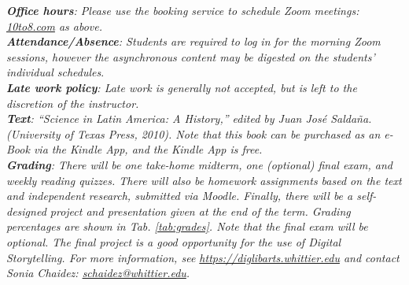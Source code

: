 \documentclass[10pt]{article}
\begin{document}
\textit{\textbf{Office hours}: Please use the booking service to schedule Zoom meetings: \url{10to8.com} as above.} \\
\textit{\textbf{Attendance/Absence}: Students are required to log in for the morning Zoom sessions, however the asynchronous content may be digested on the students' individual schedules}.\\ 
\textit{\textbf{Late work policy}: Late work is generally not accepted, but is left to the discretion of the instructor.} \\
\textit{\textbf{Text}: ``Science in Latin America: A History,'' edited by Juan Jos\'{e} Salda\~{n}a.  (University of Texas Press, 2010).  Note that this book can be purchased as an e-Book via the Kindle App, and the Kindle App is free.} \\
\textit{\textbf{Grading}: There will be one take-home midterm, one (optional) final exam, and weekly reading quizzes.  There will also be homework assignments based on the text and independent research, submitted via Moodle.  Finally, there will be a self-designed project and presentation given at the end of the term.  Grading percentages are shown in Tab. \ref{tab:grades}.  Note that the final exam will be optional. The final project is a good opportunity for the use of Digital Storytelling.  For more information, see \url{https://diglibarts.whittier.edu} and contact Sonia Chaidez: \url{schaidez@whittier.edu}. } \\
\end{document}
